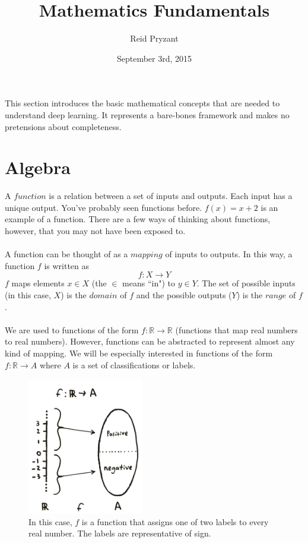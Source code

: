 \documentclass[a4paper]{article}
\title{Mathematics Fundamentals}
\author{Reid Pryzant}
\date{September 3rd, 2015}
\begin{document}
\maketitle


This section introduces the basic mathematical concepts that are needed to understand deep learning. It represents a bare-bones framework and makes no pretensions about completeness. 
\section{Algebra}
A $function$ is a relation between a set of inputs and outputs. Each input has a unique output. You've probably seen functions before. $f(x) = x + 2$ is an example of a function. There are a few ways of thinking about functions, however, that you may not have been exposed to.
\\ \\
\noindent A function can be thought of as a $mapping$ of inputs to outputs. In this way, a function $f$ is written as
\[ f: X \rightarrow Y \]
\noindent $f$ maps elements $x \in X$ (the $\in$ means ``in") to $y \in Y$. The set of possible inputs (in this case, $X$) is the $domain$ of $f$ and the possible outputs ($Y$) is the $range$ of $f$.
\\ \\
\noindent We are used to functions of the form $f: \mathbb{R} \rightarrow \mathbb{R}$ (functions that map real numbers to real numbers). However, functions can be abstracted to represent almost any kind of mapping. We will be especially interested in functions of the form $f: \mathbb{R} \rightarrow A$ where $A$ is a set of classifications or labels. 
\begin{figure}[h]
  \centering
  \includegraphics[width=2in]{figures/chap1/function}
  \caption{In this case, $f$ is a function that assigns one of two labels to every real number. The labels are representative of sign.}
\end{figure}
\end{document}
